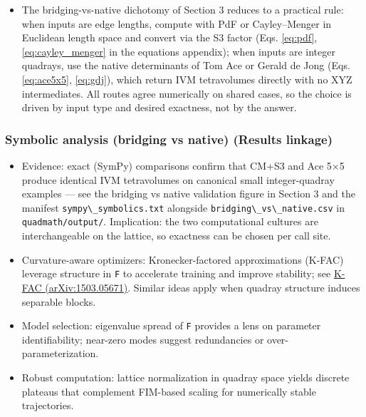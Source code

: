 \documentclass[
  10pt,
]{article}
\newcommand{\passthrough}[1]{#1}
\providecommand{\tightlist}{%
  \setlength{\itemsep}{0pt}\setlength{\parskip}{0pt}}
\begin{document}
\begin{itemize}
\tightlist
\item
  The bridging-vs-native dichotomy of Section 3 reduces to a practical
  rule: when inputs are edge lengths, compute with PdF or Cayley--Menger
  in Euclidean length space and convert via the S3 factor (Eqs.
  \eqref{eq:pdf}, \eqref{eq:cayley_menger} in the equations appendix);
  when inputs are integer quadrays, use the native determinants of Tom
  Ace or Gerald de Jong (Eqs. \eqref{eq:ace5x5}, \eqref{eq:gdj}), which
  return IVM tetravolumes directly with no XYZ intermediates. All routes
  agree numerically on shared cases, so the choice is driven by input
  type and desired exactness, not by the answer.
\end{itemize}

\subsubsection{Symbolic analysis (bridging vs native) (Results
linkage)}\label{symbolic-analysis-bridging-vs-native-results-linkage}

\begin{itemize}
\item
  Evidence: exact (SymPy) comparisons confirm that CM+S3 and Ace 5×5
  produce identical IVM tetravolumes on canonical small integer-quadray
  examples --- see the bridging vs native validation figure in Section 3
  and the manifest \passthrough{\lstinline!sympy\_symbolics.txt!}
  alongside \passthrough{\lstinline!bridging\_vs\_native.csv!} in
  \passthrough{\lstinline!quadmath/output/!}. Implication: the two
  computational cultures are interchangeable on the lattice, so
  exactness can be chosen per call site.
\item
  Curvature-aware optimizers: Kronecker-factored approximations (K-FAC)
  leverage structure in \passthrough{\lstinline!F!} to accelerate
  training and improve stability; see
  \href{https://arxiv.org/abs/1503.05671}{K-FAC (arXiv:1503.05671)}.
  Similar ideas apply when quadray structure induces separable blocks.
\item
  Model selection: eigenvalue spread of \passthrough{\lstinline!F!}
  provides a lens on parameter identifiability; near-zero modes suggest
  redundancies or over-parameterization.
\item
  Robust computation: lattice normalization in quadray space yields
  discrete plateaus that complement FIM-based scaling for numerically
  stable trajectories.
\end{itemize}
\end{document}
